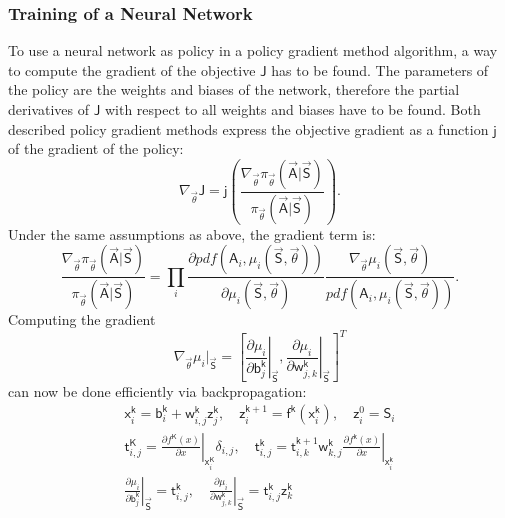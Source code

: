 \subsubsection{Training of a Neural Network}
To use a neural network as policy in a policy gradient method algorithm, a way to compute the gradient of the objective $\mathsf{J}$ has to be found. The parameters of the policy are the weights and biases of the network, therefore the partial derivatives of $\mathsf{J}$ with respect to all weights and biases have to be found. Both described policy gradient methods express the objective gradient as a function $\mathsf{j}$ of the gradient of the policy:
\begin{equation}
	\nabla_{\vec{\theta}} \mathsf{J} = \mathsf{j}\left(\frac{\nabla_{\vec{\theta}}\pi_{\vec{\theta}}(\vec{\mathsf{A}}|\vec{\mathsf{S}})} {\pi_{\vec{\theta}}(\vec{\mathsf{A}}|\vec{\mathsf{S}})}\right). \label{eq:grad_f}
\end{equation}
Under the same assumptions as above, the gradient term is: \cite[p. 335]{sutton_reinforcement_2018}
\begin{equation}
	\frac{\nabla_{\vec{\theta}}\pi_{\vec{\theta}}(\vec{\mathsf{A}}|\vec{\mathsf{S}})} {\pi_{\vec{\theta}}(\vec{\mathsf{A}}|\vec{\mathsf{S}})} = \prod_i \frac{\partial pdf(\mathsf{A}_i, \mu_i(\vec{\mathsf{S}},\vec{\theta}))}{\partial \mu_i(\vec{\mathsf{S}}, \vec{\theta})} \frac{\nabla_{\vec{\theta}} \mu_i(\vec{\mathsf{S}},\vec{\theta})}{pdf(\mathsf{A}_i, \mu_i(\vec{\mathsf{S}}, \vec{\theta}))}. \label{eq:logit}
\end{equation}
Computing the gradient
\begin{equation}
	\nabla_{\vec{\theta}} \mu_i |_{\vec{\mathsf{S}}} = \left[\left. \frac{\partial \mu_i}{\partial \mathsf{b}^\mathsf{k}_j} \right|_{\vec{\mathsf{S}}},
	\left.\frac{\partial \mu_i}{\partial \mathsf{w}^\mathsf{k}_{j,k}}\right|_{\vec{\mathsf{S}}} \right]^T \label{eq:backprop2}
\end{equation}
can now be done efficiently via backpropagation:
\begin{gather}
	\mathsf{x}^\mathsf{k}_i = \mathsf{b}^{\mathsf{k}}_i + \mathsf{w}^{\mathsf{k}}_{i,j}\mathsf{z}^\mathsf{\mathsf{k}}_j, \quad \mathsf{z}^{\mathsf{k}+1}_i = \mathsf{f}^\mathsf{k}(\mathsf{x}^\mathsf{k}_i), \quad \mathsf{z}^0_i = \mathsf{S}_i \\
	\mathsf{t}^\mathsf{K}_{i,j} = \left.\frac{\partial f^\mathsf{K}(x)}{\partial x}\right|_{\mathsf{x}^\mathsf{K}_i} \delta_{i,j}, \quad \left.\mathsf{t}^{\mathsf{k}}_{i,j} = \mathsf{t}^{\mathsf{k}+1}_{i,k} \mathsf{w}^\mathsf{k}_{k,j} \frac{\partial f^\mathsf{k}(x)}{\partial x}\right|_{\mathsf{x}^\mathsf{k}_i} \\
	\left. \frac{\partial \mu_i}{\partial \mathsf{b}^\mathsf{k}_j}\right|_{\vec{\mathsf{S}}} = \mathsf{t}^\mathsf{k}_{i,j}, \quad \left. \frac{\partial \mu_i}{\partial \mathsf{w}^\mathsf{k}_{j,k}} \right|_{\vec{\mathsf{S}}} = \mathsf{t}^\mathsf{k}_{i,j} \mathsf{z}^\mathsf{k}_k
\end{gather}
